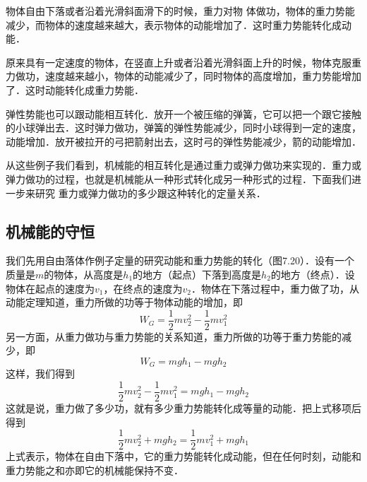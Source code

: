 物体自由下落或者沿着光滑斜面滑下的时候，重力对物
体做功，物体的重力势能减少，而物体的速度越来越大，表示物体的动能增加了．这时重力势能转化成动能．

原来具有一定速度的物体，在竖直上升或者沿着光滑斜面上升的时候，物体克服重力做功，速度越来越小，物体的动能减少了，同时物体的高度增加，重力势能增加了．这时动能转化成重力势能．

弹性势能也可以跟动能相互转化．放开一个被压缩的弹簧，它可以把一个跟它接触的小球弹出去．这时弹力做功，弹簧的弹性势能减少，同时小球得到一定的速度，动能增加．放开被拉开的弓把箭射出去，这时弓的弹性势能减少，箭的动能增加．

从这些例子我们看到，机械能的相互转化是通过重力或弹力做功来实现的．重力或弹力做功的过程，也就是机械能从一种形式转化成另一种形式的过程．下面我们进一步来研究
重力或弹力做功的多少跟这种转化的定量关系．
	
\subsection{机械能的守恒} 
\begin{figure}[htp]\centering
{}
\caption{}
\end{figure}

我们先用自由落体作例子定量的研究动能和重力势能的转化（图7.20）．设有一个质量是$m$的物体，从高度是$h_1$的地方（起点）下落到高度是$h_2$的地方（终点）．设
物体在起点的速度为$v_1$，在终点的速度为$v_2$．物体在下落过程中，重力做了功，从动能定理知道，重力所做的功等于物体动能的增加，即
\[W_G=\frac{1}{2}mv_2^2-\frac{1}{2}mv^2_1 \]
另一方面，从重力做功与重力势能的关系知道，重力所做的功等于重力势能的减少，即
\[W_G=mgh_1-mgh_2\]
这样，我们得到
\[\frac{1}{2}mv_2^2-\frac{1}{2}mv^2_1 =mgh_1-mgh_2\]
这就是说，重力做了多少功，就有多少重力势能转化成等量的动能．把上式移项后得到
\[ \frac{1}{2}mv^2_2 +mgh_2=\frac{1}{2}mv^2_1 +mgh_1\]
上式表示，物体在自由下落中，它的重力势能转化成动能，但在任何时刻，动能和重力势能之和亦即它的机械能保持不变．

